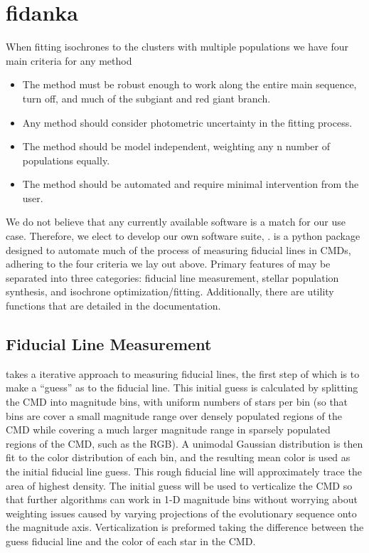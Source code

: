 \section{fidanka}\label{sec:fidanka}
When fitting isochrones to the clusters with multiple populations we have four
main criteria for any method

\begin{itemize}
  \item The method must be robust enough to work along the entire main
    sequence, turn off, and much of the subgiant and red giant branch.
	\item Any method should consider photometric uncertainty in the fitting process.
	\item The method should be model independent, weighting any n number of populations equally.
	\item The method should be automated and require minimal intervention from the user.
\end{itemize}


We do not believe that any currently available software is a match for
our use case. Therefore, we elect to develop our own software suite, \fidanka.
\fidanka is a python package designed to automate much of the process of
measuring fiducial lines in CMDs, adhering to the four criteria we lay out
above. Primary features of \fidanka may be separated into three
categories: fiducial line measurement, stellar population synthesis, and
isochrone optimization/fitting. Additionally, there are utility functions that
are detailed in the \fidanka documentation.

\subsection{Fiducial Line Measurement}
\fidanka takes a iterative approach to measuring fiducial lines, the first step
of which is to make a ``guess'' as to the fiducial line. This initial guess
is calculated by splitting the CMD into magnitude bins, with uniform numbers of
stars per bin (so that bins are cover a small magnitude range over densely
populated regions of the CMD while covering a much larger magnitude range in
sparsely populated regions of the CMD, such as the RGB). A unimodal Gaussian
distribution is then fit to the color distribution of each bin, and the
resulting mean color is used as the initial fiducial line guess. This rough
fiducial line will approximately trace the area of highest density. The initial
guess will be used to verticalize the CMD so that further algorithms can work in
1-D magnitude bins without worrying about weighting issues caused by varying
projections of the evolutionary sequence onto the magnitude axis.
Verticalization is preformed taking the difference between the guess fiducial
line and the color of each star in the CMD.

